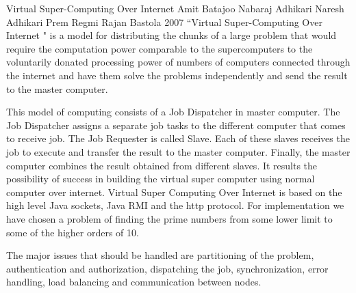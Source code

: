 \begin{conf-abstract}[]
{Virtual Super-Computing Over Internet}
{ 
Amit Batajoo
Nabaraj Adhikari
Naresh Adhikari
Prem Regmi
Rajan Bastola
}
{2007}
``Virtual Super-Computing Over Internet " is a model for distributing the chunks of a large problem that would require the computation power comparable to the supercomputers to the voluntarily donated processing power of numbers of computers connected through the internet and have them solve the problems independently and send the result to the master computer.

This model of computing consists of a Job Dispatcher in master computer. The Job Dispatcher assigns a separate job tasks to the different computer that comes to receive job. The Job Requester is called Slave. Each of these slaves receives the job to execute and transfer the result to the master computer. Finally, the master computer combines the result obtained from different slaves. It results the possibility of success in building the virtual super computer using normal computer over internet. Virtual Super Computing Over Internet is based on the high level Java sockets, Java RMI and the http protocol. For implementation we have chosen a problem of finding the prime numbers from some lower limit to some of the higher orders of 10.

The major issues that should be handled are partitioning of the problem, authentication and authorization, dispatching the job, synchronization, error handling, load balancing and communication between nodes.
\end{conf-abstract}